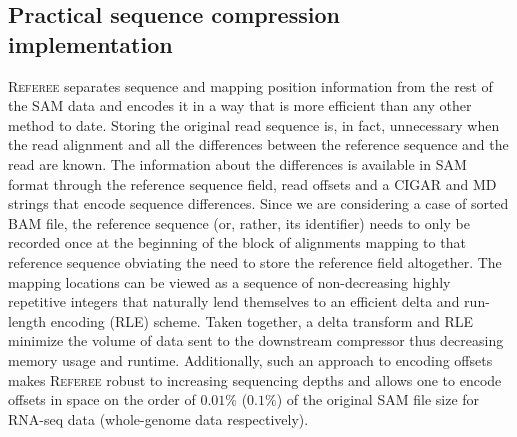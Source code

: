 \documentclass[12pt]{cmuthesis}
\newcommand{\refer}{\textsc{Referee}\xspace}
\begin{document}
  \subsection{Practical sequence compression implementation} %
  \refer separates sequence and mapping position information from the rest of the SAM data and encodes it in a way that is more efficient than any other method to date. Storing the original read sequence is, in fact, unnecessary when the read alignment and all the differences between the reference sequence and the read are known. The information about the differences is available in SAM format through the reference sequence field, read offsets and a CIGAR and MD strings that encode sequence differences. Since we are considering a case of sorted BAM file, the reference sequence (or, rather, its identifier) needs to only be recorded once at the beginning of the block of alignments mapping to that reference sequence obviating the need to store the reference field altogether. The mapping locations can be viewed as a sequence of non-decreasing highly repetitive integers that naturally lend themselves to an efficient delta and run-length encoding (RLE) scheme. Taken together, a delta transform and RLE minimize the volume of data sent to the downstream compressor thus decreasing memory usage and runtime. Additionally, such an approach to encoding offsets makes \refer robust to increasing sequencing depths and allows one to encode offsets in space on the order of $0.01\%$ ($0.1\%$) of the original SAM file size for RNA-seq data (whole-genome data respectively).

\end{document}
